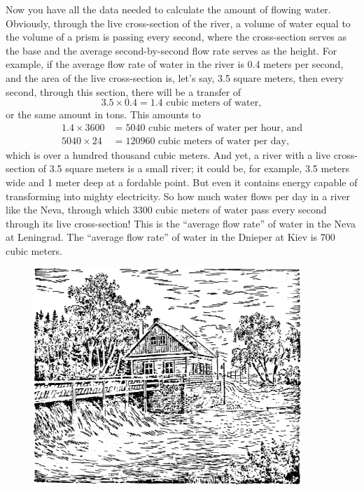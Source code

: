 Now you have all the data needed to calculate the amount of flowing water. Obviously, through the live cross-section of the river, a volume of water equal to the volume of a prism is passing every second, where the cross-section serves as the base and the average second-by-second flow rate serves as the height. For example, if the average flow rate of water in the river is 0.4 meters per second, and the area of the live cross-section is, let's say, 3.5 square meters, then every second, through this section, there will be a transfer of
\begin{equation*}%
3.5 \times 0.4 = 1.4 \,\, \text{cubic meters of water},
\end{equation*}
or the same amount in tons. This amounts to 
\begin{align*}%
1.4 \times 3600 & = 5040 \,\, \text{cubic meters of water per hour, and}\\
5040 \times 24 & = \num{120960} \,\, \text{cubic meters of water per day},
\end{align*}
which is over a hundred thousand cubic meters. And yet, a river with a live cross-section of 3.5 square meters is a small river; it could be, for example, 3.5 meters wide and 1 meter deep at a fordable point. But even it contains energy capable of transforming into mighty electricity. So how much water flows per day in a river like the Neva, through which 3300 cubic meters of water pass every second through its live cross-section! This is the ``average flow rate'' of water in the Neva at Leningrad. The ``average flow rate'' of water in the Dnieper at Kiev is 700 cubic meters.

\begin{figure}[h!]
\centering
\includegraphics[width=0.9\textwidth]{figures/ch-02/fig-043.pdf}
\end{figure}

